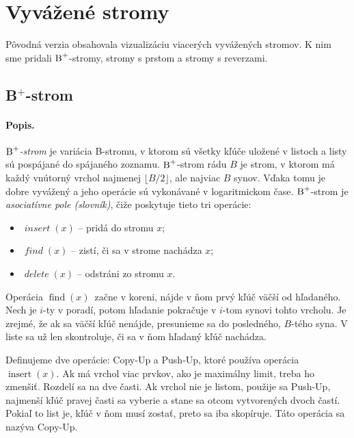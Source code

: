 \def\ins{$\mathop{insert}(x)$}
\def\find{$\mathop{find}(x)$}
\def\delete{$\mathop{delete}(x)$}
\def\reverse{$\mathop{reverse}(i, j)$}
\def\Bp{$\hbox{\rm B}^+$}

\section{Vyvážené stromy}

Pôvodná verzia \citep{kuko} obsahovala vizualizáciu viacerých vyvážených stromov.
K nim sme pridali \Bp-stromy, stromy s prstom a stromy s reverzami.

\subsection{B$^+$-strom}

\paragraph{Popis.}
\emph{\Bp-strom} je variácia B-stromu, v ktorom sú všetky kľúče uložené v listoch
a listy sú pospájané do spájaného zoznamu. \Bp-strom rádu $B$ je strom, v ktorom
má každý vnútorný vrchol najmenej $\lfloor B/2 \rfloor$, ale najviac $B$ synov.
Vďaka tomu je dobre vyvážený a jeho operácie sú vykonávané v logaritmickom čase.
\Bp-strom je \emph{asociatívne pole (slovník)}, čiže poskytuje tieto tri operácie:
\begin{itemize}
\item $\mathop{\mathit{insert}}(x)$ -- pridá do stromu $x$;
\item $\mathop{\mathit{find}}(x)$ -- zistí, či sa v strome nachádza $x$;
\item $\mathop{\mathit{delete}}(x)$ -- odstráni zo stromu $x$.
\end{itemize}

Operácia \find\ začne v koreni, nájde v ňom prvý kľúč väčší od hľadaného.
Nech je $i$-ty v poradí, potom hľadanie pokračuje v $i$-tom synovi tohto vrcholu.
Je zrejmé, že ak sa väčší kľúč nenájde, presunieme sa do posledného, $B$-tého syna.
V liste sa už len skontroluje, či sa v ňom hľadaný kľúč nachádza.

Definujeme dve operácie: {\sc Copy-Up} a {\sc Push-Up}, ktoré používa operácia \ins.
Ak má vrchol viac prvkov, ako je maximálny limit, treba ho zmenšiť. Rozdelí sa na dve časti.
Ak vrchol nie je listom, použije sa {\sc Push-Up}, najmenší kľúč pravej časti sa vyberie
a stane sa otcom vytvorených dvoch častí. Pokiaľ to list je, kľúč v ňom musí zostať,
preto sa iba skopíruje. Táto operácia sa nazýva {\sc Copy-Up}.

